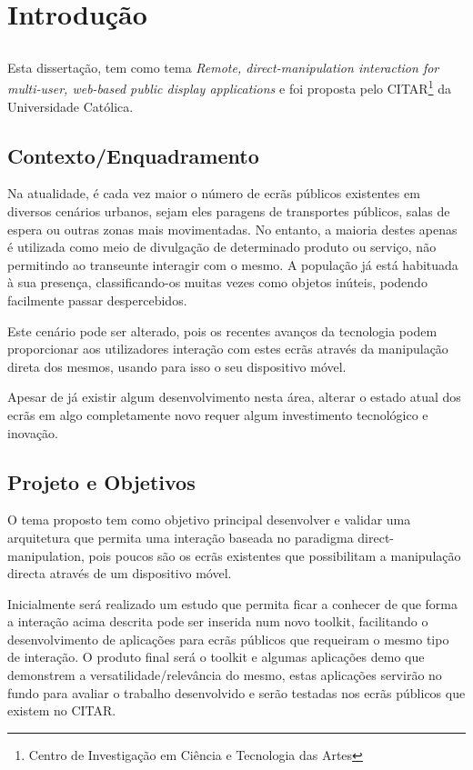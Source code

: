 \chapter{Introdução} \label{chap:intro}

\section*{}
 
Esta dissertação, tem como tema \textit{Remote, direct-manipulation interaction for multi-user, web-based public display applications} e foi proposta pelo CITAR\footnote{Centro de Investigação em Ciência e Tecnologia das Artes} da Universidade Católica.  

\section{Contexto/Enquadramento} \label{sec:context}

Na atualidade, é cada vez maior o número de ecrãs públicos existentes em diversos cenários urbanos, sejam eles paragens de transportes públicos, salas de espera ou outras zonas mais movimentadas. No entanto, a maioria destes apenas é utilizada como meio de divulgação de determinado produto ou serviço, não permitindo ao transeunte interagir com o mesmo. A população já está habituada à sua presença, classificando-os muitas vezes como objetos inúteis, podendo facilmente passar despercebidos. 

Este cenário pode ser alterado, pois os recentes avanços da tecnologia podem proporcionar aos utilizadores interação com estes ecrãs através da manipulação direta dos mesmos, usando para isso o seu dispositivo móvel. 

Apesar de já existir algum desenvolvimento nesta área, alterar o estado atual dos ecrãs em algo completamente novo requer algum investimento tecnológico e inovação.

\section{Projeto e Objetivos} \label{sec:proj}

O tema proposto tem como objetivo principal desenvolver e validar uma arquitetura que permita uma interação baseada no paradigma direct-manipulation, pois poucos são os ecrãs existentes que possibilitam a manipulação directa através de um dispositivo móvel.

Inicialmente será realizado um estudo que permita ficar a conhecer de que forma a interação acima descrita pode ser inserida num novo toolkit, facilitando o desenvolvimento de aplicações para ecrãs públicos que requeiram o mesmo tipo de interação. 
O produto final será o toolkit  e algumas aplicações demo que demonstrem a versatilidade/relevância do mesmo, estas aplicações servirão no fundo para avaliar o trabalho desenvolvido e serão testadas nos ecrãs públicos que existem no CITAR.

